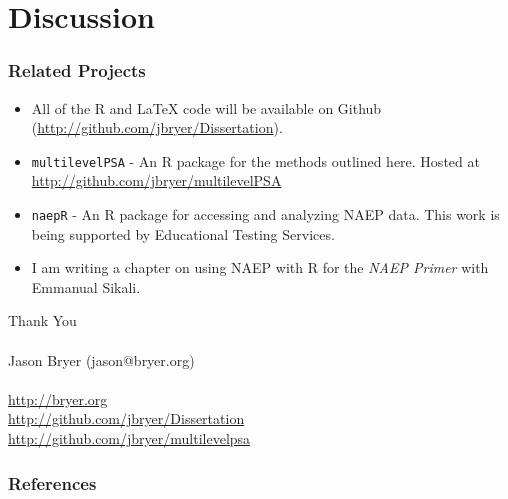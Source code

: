 \documentclass[10pt,slidestop,mathserif]{beamer}
\begin{document}
\section{Discussion}

\begin{frame}[c]
	\frametitle{Related Projects}
	\begin{itemize}
		\item All of the R and \LaTeX{} code will be available on Github (\url{http://github.com/jbryer/Dissertation}).
		\item \texttt{multilevelPSA} - An R package for the methods outlined here. Hosted at \url{http://github.com/jbryer/multilevelPSA}
		\item \texttt{naepR} - An R package for accessing and analyzing NAEP data. This work is being supported by Educational Testing Services.
		\item I am writing a chapter on using NAEP with R for the \textit{NAEP Primer} with Emmanual Sikali.
	\end{itemize}
\end{frame}


\begin{frame}[c]
	\LARGE{Thank You}\\
	\normalsize
	\ \\
	Jason Bryer (jason@bryer.org)\\
	\ \\
	\url{http://bryer.org}\\
	\url{http://github.com/jbryer/Dissertation}\\
	\url{http://github.com/jbryer/multilevelpsa}
\end{frame}

\begin{frame}[c,shrink=30]
	\frametitle{References}
	
	
\end{frame}
\end{document}
